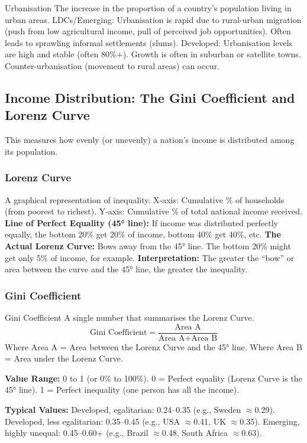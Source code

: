 \documentclass[11pt, a4paper, twoside]{book}
\begin{document}
\begin{keyterm}{Urbanisation}
The increase in the proportion of a country's population living in urban areas. LDCs/Emerging: Urbanisation is rapid due to rural-urban migration (push from low agricultural income, pull of perceived job opportunities). Often leads to sprawling informal settlements (slums). Developed: Urbanisation levels are high and stable (often 80\%+). Growth is often in suburban or satellite towns. Counter-urbanisation (movement to rural areas) can occur.
\end{keyterm}

\subsection{Income Distribution: The Gini Coefficient and Lorenz Curve}

This measures how evenly (or unevenly) a nation's income is distributed among its population.

\subsubsection{Lorenz Curve}

A graphical representation of inequality. X-axis: Cumulative \% of households (from poorest to richest). Y-axis: Cumulative \% of total national income received. \textbf{Line of Perfect Equality (45° line):} If income was distributed perfectly equally, the bottom 20\% get 20\% of income, bottom 40\% get 40\%, etc. \textbf{The Actual Lorenz Curve:} Bows away from the 45° line. The bottom 20\% might get only 5\% of income, for example. \textbf{Interpretation:} The greater the ``bow'' or area between the curve and the 45° line, the greater the inequality.

\subsubsection{Gini Coefficient}

\begin{keyterm}{Gini Coefficient}
A single number that summarises the Lorenz Curve.
\[ \text{Gini Coefficient} = \frac{\text{Area A}}{\text{Area A} + \text{Area B}} \]
Where Area A = Area between the Lorenz Curve and the 45° line. Where Area B = Area under the Lorenz Curve.

\textbf{Value Range:} 0 to 1 (or 0\% to 100\%). 0 = Perfect equality (Lorenz Curve is the 45° line). 1 = Perfect inequality (one person has all the income).

\textbf{Typical Values:} Developed, egalitarian: 0.24--0.35 (e.g., Sweden $\approx$0.29). Developed, less egalitarian: 0.35--0.45 (e.g., USA $\approx$0.41, UK $\approx$0.35). Emerging, highly unequal: 0.45--0.60+ (e.g., Brazil $\approx$0.48, South Africa $\approx$0.63).
\end{keyterm}
\end{document}
